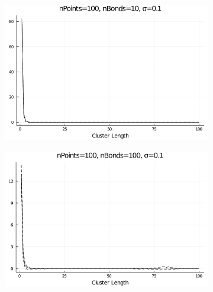 \begin{figure}
\begin{subfigure}{0.32\textwidth}
		\centering
		\includegraphics[width=\textwidth]{figures/ClusterLengthDistributionWithNBonds/sigma0.1/clusterLengthDistribution_nPoints100 nBonds10 sigma0.1.png}
	\end{subfigure}
\hspace{-0.2cm}
\begin{subfigure}{0.32\textwidth}
		\centering
		\includegraphics[width=\textwidth]{figures/ClusterLengthDistributionWithNBonds/sigma0.1/clusterLengthDistribution_nPoints100 nBonds100 sigma0.1.png}
\end{subfigure} \hspace{-0.3cm}
\begin{subfigure}{0.32\textwidth}
		\centering

\end{subfigure}
\end{figure}
